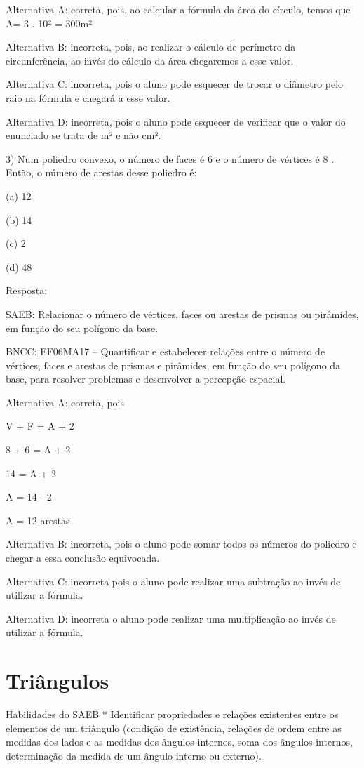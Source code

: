Alternativa A: correta, pois, ao calcular a fórmula da área do círculo,
temos que A= 3 . 10² = 300m²

Alternativa B: incorreta, pois, ao realizar o cálculo de perímetro da
circunferência, ao invés do cálculo da área chegaremos a esse valor.

Alternativa C: incorreta, pois o aluno pode esquecer de trocar o
diâmetro pelo raio na fórmula e chegará a esse valor.

Alternativa D: incorreta, pois o aluno pode esquecer de verificar que o
valor do enunciado se trata de m² e não cm².

3) Num poliedro convexo, o número de faces é 6 e o número de vértices é
8 . Então, o número de arestas desse poliedro é:

(a) 12

(b) 14

(c) 2

(d) 48

Resposta:

SAEB: Relacionar o número de vértices, faces ou arestas de prismas ou
pirâmides, em função do seu polígono da base.

BNCC: EF06MA17 -- Quantificar e estabelecer relações entre o número de
vértices, faces e arestas de prismas e pirâmides, em função do seu
polígono da base, para resolver problemas e desenvolver a percepção
espacial.

Alternativa A: correta, pois

V + F = A + 2

8 + 6 = A + 2

14 = A + 2

A = 14 - 2

A = 12 arestas

Alternativa B: incorreta, pois o aluno pode somar todos os números do
poliedro e chegar a essa conclusão equivocada.

Alternativa C: incorreta pois o aluno pode realizar uma subtração ao
invés de utilizar a fórmula.

Alternativa D: incorreta o aluno pode realizar uma multiplicação ao
invés de utilizar a fórmula.

\chapter{Triângulos}

Habilidades do SAEB * Identificar propriedades e relações existentes
entre os elementos de um triângulo (condição de existência, relações de
ordem entre as medidas dos lados e as medidas dos ângulos internos, soma
dos ângulos internos, determinação da medida de um ângulo interno ou
externo).

